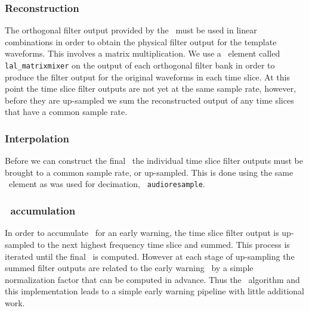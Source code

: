 \subsubsection{Reconstruction}

The orthogonal filter output provided by the \SVD\ must be used in linear
combinations in order to obtain the physical filter output for the template
waveforms.  This involves a matrix multiplication.  We use a \gstlal\ element
called {\tt lal\_matrixmixer} on the output of each orthogonal filter bank in
order to produce the filter output for the original waveforms in each time
slice.  At this point the time slice filter outputs are not yet at the same
sample rate, however, before they are up-sampled we sum the reconstructed output
of any time slices that have a common sample rate.

\subsubsection{Interpolation}

Before we can construct the final \SNR\, the individual time slice filter
outputs must be brought to a common sample rate, or up-sampled.  This is done
using the same \gstreamer\ element as was used for decimation, {\tt
audioresample}.  

\subsubsection{\SNR\ accumulation}

In order to accumulate \SNR\ for an early warning, the time slice filter
output is up-sampled to the next highest frequency time slice and summed. This
process is iterated until the final \SNR\ is computed.  However at each stage
of up-sampling the summed filter outputs are related to the early warning \SNR\
by a simple normalization factor that can be computed in advance. Thus the
\lloid\ algorithm and this implementation leads to a simple early warning
pipeline with little additional work.

